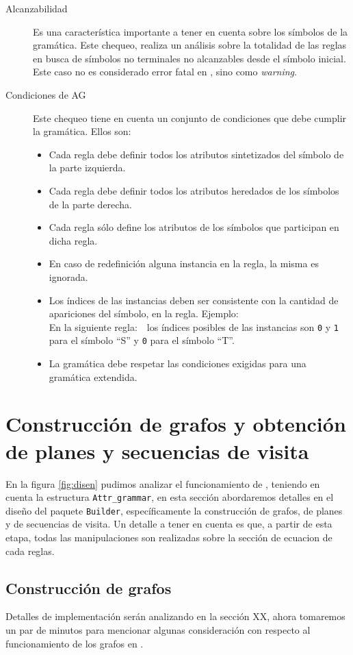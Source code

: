 \begin{description}
\item [Alcanzabilidad] Es una característica importante a tener en cuenta sobre los símbolos de la gramática. Este chequeo, realiza un análisis sobre la totalidad de las reglas en busca de símbolos no terminales no alcanzables desde el símbolo inicial. Este caso no es considerado error fatal en \maggen, sino como \textit{warning}.
\item [Condiciones de AG] Este chequeo tiene en cuenta un conjunto de condiciones que debe cumplir la gramática. Ellos son:
\begin{itemize}
\item Cada regla debe definir todos los atributos sintetizados del símbolo de la parte izquierda.
\item Cada regla debe definir todos los atributos heredados de los símbolos de la parte derecha.
\item Cada regla sólo define los atributos de los símbolos que participan en dicha regla.
\item En caso de redefinición alguna instancia en la regla, la misma es ignorada.
\item Los índices de las instancias deben ser consistente con la cantidad de apariciones del símbolo, en la regla. Ejemplo: \\En la siguiente regla:\ \ los índices posibles de las instancias son \texttt{0} y \texttt{1} para el símbolo ``S'' y \texttt{0} para el símbolo ``T''.
\item La gramática debe respetar las condiciones exigidas para una gramática extendida. 
\end{itemize}
\end{description}

\section{Construcción de grafos y obtención de planes y secuencias de visita}
En la figura \ref{fig:disen} pudimos analizar el funcionamiento de \maggen, teniendo en cuenta la estructura \texttt{Attr\_grammar}, en esta sección abordaremos detalles en el diseño del paquete \texttt{Builder}, específicamente la construcción de grafos, de planes y de secuencias de visita. Un detalle a tener en cuenta es que, a partir de esta etapa,  todas las manipulaciones son realizadas sobre la sección de ecuacion de cada reglas.

\subsection*{Construcción de grafos}
\label{subsec:graph}
Detalles de implementación serán analizando en la sección XX, ahora tomaremos un par de minutos para mencionar algunas consideración con respecto al funcionamiento de los grafos en \maggen.

